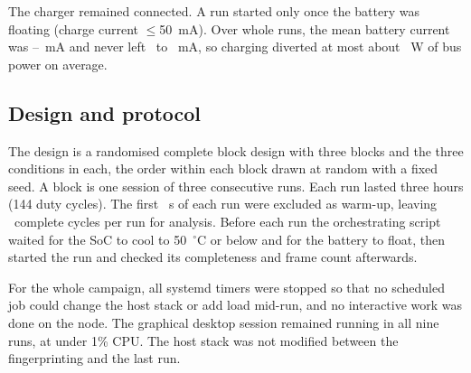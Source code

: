 \documentclass[10pt,journal,compsoc]{IEEEtran}
\begin{document}
The charger remained connected. A run started only once the battery was floating (charge current $\le$50~mA). Over whole runs, the mean battery current was \BatIMeanMin--\BatIMeanMax~mA and never left \BatIMin\ to \BatIMax~mA, so charging diverted at most about \BatWMax~W of bus power on average.

\subsection{Design and protocol}
The design is a randomised complete block design with three blocks and the three conditions in each, the order within each block drawn at random with a fixed seed. A block is one session of three consecutive runs. Each run lasted three hours (144 duty cycles). The first \WarmupS~s of each run were excluded as warm-up, leaving \CyclesAnalysed\ complete cycles per run for analysis. Before each run the orchestrating script waited for the SoC to cool to 50~$^\circ$C or below and for the battery to float, then started the run and checked its completeness and frame count afterwards.

For the whole campaign, all systemd timers were stopped so that no scheduled job could change the host stack or add load mid-run, and no interactive work was done on the node. The graphical desktop session remained running in all nine runs, at under 1\% CPU. The host stack was not modified between the fingerprinting and the last run.
\end{document}
